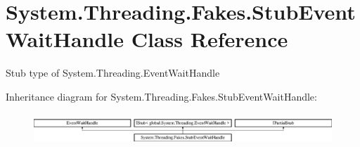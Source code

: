 \hypertarget{class_system_1_1_threading_1_1_fakes_1_1_stub_event_wait_handle}{\section{System.\-Threading.\-Fakes.\-Stub\-Event\-Wait\-Handle Class Reference}
\label{class_system_1_1_threading_1_1_fakes_1_1_stub_event_wait_handle}
}


Stub type of System.\-Threading.\-Event\-Wait\-Handle 


Inheritance diagram for System.\-Threading.\-Fakes.\-Stub\-Event\-Wait\-Handle\-:\begin{figure}[H]
\begin{center}
\leavevmode
\includegraphics[height=1.200429cm]{class_system_1_1_threading_1_1_fakes_1_1_stub_event_wait_handle}
\end{center}
\end{figure}
